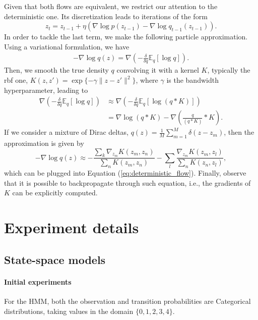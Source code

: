 Given that both flows are equivalent, we restrict our attention to the deterministic one. Its discretization  leads to iterations of the form
\begin{equation}\label{eq:deterministic_flow}
z_{t} = z_{t-1} + \eta (\nabla \log p(z_{t-1}) - \nabla \log q_{t-1} (z_{t-1})).
\end{equation}
In order to tackle the last term, we make the following particle approximation. Using a variational formulation, we have 
\begin{align*}
    - \nabla \log q(z) = \nabla \left( - \frac{\delta}{\delta q} \mathbb{E}_q \left[ \log q\right] \right).
\end{align*}
Then, we smooth the true density $q$ convolving it with a kernel $K$, typically the rbf one, $K(z, z') = \exp \lbrace - \gamma \| z - z' \|^2 \rbrace$, where $\gamma$ is the bandwidth hyperparameter, leading to
\begin{align*}
    \nabla \left( - \frac{\delta}{\delta q} \mathbb{E}_q \left[ \log q\right] \right) &\approx
     \nabla \left( - \frac{\delta}{\delta q} \mathbb{E}_q \left[ \log (q\ast K )\right] \right) \\
     &= \nabla \log (q \ast K) - \nabla \left( \frac{q}{(q \ast K)} \ast K \right).
\end{align*}
If we consider a mixture of Dirac deltas, $q(z) = \frac{1}{M} \sum_{m=1}^M \delta(z - z_m)$, then the approximation is given 
by
$$
- \nabla \log q(z) \approx - \frac{\sum_k \nabla_{z_m} K(z_m, z_n)}{\sum_n K(z_m, z_n)}
- \sum_l \frac{\nabla_{z_m} K(z_m, z_l)}{\sum_n K(z_n, z_l)},
$$
which can be plugged into Equation (\ref{eq:deterministic_flow}). Finally, observe that 
it is possible to backpropagate through such equation, i.e., the gradients of $K$ can be explicitly computed.

\section{Experiment details}\label{sec:detail}


\subsection{State-space models}\label{app:ss}

\paragraph{Initial experiments}\label{app:hmm}
For the HMM, both the observation and transition probabilities are Categorical distributions, taking values in the domain $\lbrace 0, 1, 2, 3, 4 \rbrace$.

